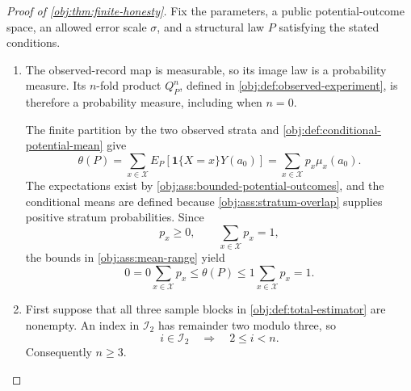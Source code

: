 \documentclass[11pt]{article}
\begin{document}
\begin{proof}[Proof of \cref{obj:thm:finite-honesty}]
Fix the parameters, a public potential-outcome space, an allowed error scale \(\sigma\), and a structural law \(P\) satisfying the stated conditions.

\begin{enumerate}
\item The observed-record map is measurable, so its image law is a probability measure. Its \(n\)-fold product \(Q_P^n\), defined in \cref{obj:def:observed-experiment}, is therefore a probability measure, including when \(n=0\).

The finite partition by the two observed strata and \cref{obj:def:conditional-potential-mean} give
\[
\theta(P)
=\sum_{x\in\mathcal X}E_P[\mathbf1\{X=x\}Y(a_0)]
=\sum_{x\in\mathcal X}p_x\mu_x(a_0).
\]
The expectations exist by \cref{obj:ass:bounded-potential-outcomes}, and the conditional means are defined because \cref{obj:ass:stratum-overlap} supplies positive stratum probabilities. Since
\[
p_x\ge0,\qquad \sum_{x\in\mathcal X}p_x=1,
\]
the bounds in \cref{obj:ass:mean-range} yield
\[
0
=0\sum_{x\in\mathcal X}p_x
\le\theta(P)
\le1\sum_{x\in\mathcal X}p_x
=1.
\]

\item First suppose that all three sample blocks in \cref{obj:def:total-estimator} are nonempty. An index in \(\mathcal I_2\) has remainder two modulo three, so
\[
i\in\mathcal I_2
\quad\Longrightarrow\quad
2\le i<n.
\]
Consequently \(n\ge3\).


\end{enumerate}
\end{proof}
\end{document}
